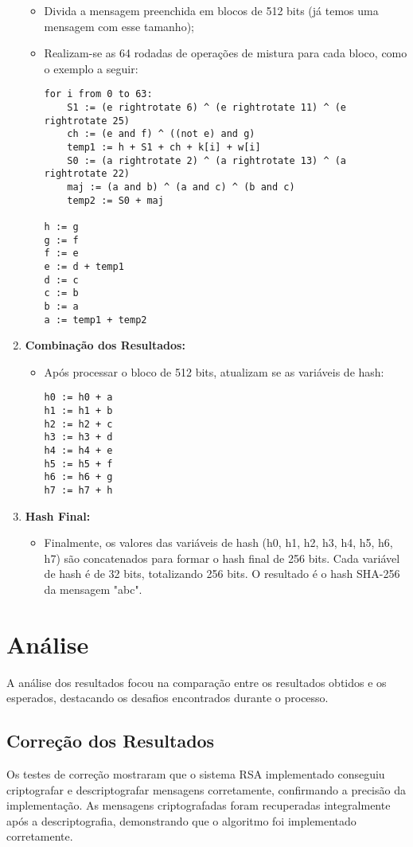\documentclass[a4paper,12pt]{article}
\begin{document}
\begin{enumerate}
\begin{itemize}
            \item Divida a mensagem preenchida em blocos de 512 bits (já temos uma mensagem com esse tamanho);
            \item Realizam-se as 64 rodadas de operações de mistura para cada bloco, como o exemplo a seguir:
            \begin{lstlisting}
for i from 0 to 63:
    S1 := (e rightrotate 6) ^ (e rightrotate 11) ^ (e rightrotate 25)
    ch := (e and f) ^ ((not e) and g)
    temp1 := h + S1 + ch + k[i] + w[i]
    S0 := (a rightrotate 2) ^ (a rightrotate 13) ^ (a rightrotate 22)
    maj := (a and b) ^ (a and c) ^ (b and c)
    temp2 := S0 + maj

h := g
g := f
f := e
e := d + temp1
d := c
c := b
b := a
a := temp1 + temp2
            \end{lstlisting}
        \end{itemize}
    \item \textbf{Combinação dos Resultados:}
        \begin{itemize}
            \item Após processar o bloco de 512 bits, atualizam se as variáveis de hash:
            \begin{lstlisting}
h0 := h0 + a
h1 := h1 + b
h2 := h2 + c
h3 := h3 + d
h4 := h4 + e
h5 := h5 + f
h6 := h6 + g
h7 := h7 + h
            \end{lstlisting}
        \end{itemize}
    \item \textbf{Hash Final:}
        \begin{itemize}
            \item Finalmente, os valores das variáveis de hash (h0, h1, h2, h3, h4, h5, h6, h7) são concatenados para formar o hash final de 256 bits. Cada variável de hash é de 32 bits, totalizando 256 bits. O resultado é o hash SHA-256 da mensagem "abc".
        \end{itemize}
\end{enumerate}

\section*{Análise}
A análise dos resultados focou na comparação entre os resultados obtidos e os esperados, destacando os desafios encontrados durante o processo.

\subsection*{Correção dos Resultados}
Os testes de correção mostraram que o sistema RSA implementado conseguiu criptografar e descriptografar mensagens corretamente, confirmando a precisão da implementação. As mensagens criptografadas foram recuperadas integralmente após a descriptografia, demonstrando que o algoritmo foi implementado corretamente.
\end{document}
